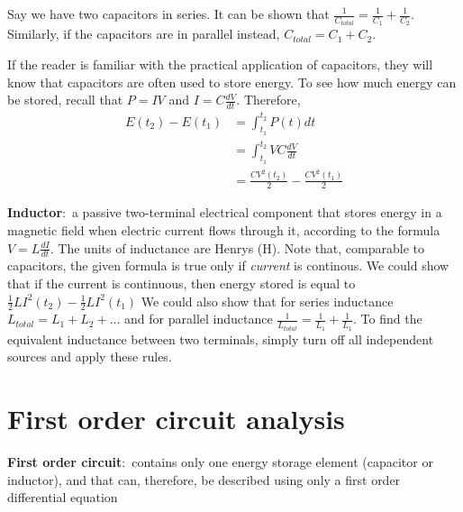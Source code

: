 \documentclass[nobib]{tufte-handout}
\newcommand{\defn}[2]{\noindent\textbf{#1}:\ #2}
\begin{document}
Say we have two capacitors in series. It can be shown that 
$\frac{1}{C_{total}} = \frac{1}{C_1} + \frac{1}{C_2}$. Similarly, if 
the capacitors are in parallel instead, $C_{total} = C_1 + C_2$. 

If the reader is familiar with the practical application of capacitors, 
they will know that capacitors are often used to store energy. To see how 
much energy can be stored, recall that $P = IV$ and $I = C\frac{dV}{dt}$. 
Therefore, 
\begin{align*}
    E(t_2)-E(t_1) &= \int_{t_1}^{t_2} P(t) dt \\
    &= \int_{t_1}^{t_2} VC\frac{dV}{dt} \\
    &= \frac{CV^2(t_2)}{2} - \frac{CV^2(t_1)}{2}
\end{align*}

\defn{Inductor}{a passive two-terminal electrical 
component that stores energy in a magnetic field when 
electric current flows through it, according to the 
formula $V = L\frac{dI}{dt}$}. The units of inductance are Henrys (H).
Note that, comparable to capacitors, the given formula is true 
only if \emph{current} is continous. We could show that if the 
current is continuous, then energy stored is equal to $\frac{1}{2}LI^2(t_2) - \frac{1}{2}LI^2(t_1)$
We could also show that for series inductance $L_{total} = L_1+L_2+\dots$
and for parallel inductance $\frac{1}{L_{total}} = \frac{1}{L_1} + \frac{1}{L_1}$. 
To find the equivalent inductance between two terminals, simply turn off all 
independent sources and apply these rules. 

\pagebreak 

\section{First order circuit analysis}

\defn{First order circuit}{contains only one energy storage element 
(capacitor or inductor), and that can, therefore, be described using 
only a first order differential equation}
\end{document}
